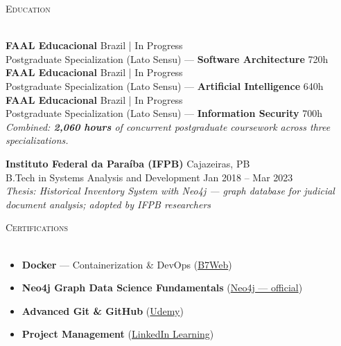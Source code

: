 \documentclass[a4paper]{article}
\newcommand{\lineunder}{
    \vspace*{-8pt} \\
    \hspace*{-18pt} \hrulefill \\
}
\newcommand{\header}[1]{
    {\hspace*{-18pt}\vspace*{6pt} \textsc{#1}}
    \vspace*{-6pt} \lineunder
}
\begin{document}
\vspace{3mm}

\header{Education}
\vspace{2mm}

\textbf{FAAL Educacional} \hfill Brazil | In Progress\\
Postgraduate Specialization (Lato Sensu) — \textbf{Software Architecture} \hfill 720h\\
\vspace{1mm}
\textbf{FAAL Educacional} \hfill Brazil | In Progress\\
Postgraduate Specialization (Lato Sensu) — \textbf{Artificial Intelligence} \hfill 640h\\
\vspace{1mm}
\textbf{FAAL Educacional} \hfill Brazil | In Progress\\
Postgraduate Specialization (Lato Sensu) — \textbf{Information Security} \hfill 700h\\
\vspace{2mm}
{\small \textit{Combined: \textbf{2,060 hours} of concurrent postgraduate coursework across three specializations.}}\\
\vspace{3mm}

\textbf{Instituto Federal da Para\'{i}ba (IFPB)} \hfill Cajazeiras, PB\\
B.Tech in Systems Analysis and Development \hfill Jan 2018 -- Mar 2023\\
{\small \textit{Thesis: Historical Inventory System with Neo4j — graph database for judicial document analysis; adopted by IFPB researchers}}\\

\vspace{3mm}

\header{Certifications}
\vspace{2mm}
\begin{itemize}[leftmargin=*, itemsep=-2pt]
    \item \textbf{Docker} — Containerization \& DevOps (\href{https://drive.google.com/drive/folders/1YKThgvnT5h1bA_Hb0uDiIf7p8Qiph-NC}{B7Web})
    \item \textbf{Neo4j Graph Data Science Fundamentals} (\href{https://graphacademy.neo4j.com/c/9d25b259-5995-4053-8475-7b2bf61f163e/}{Neo4j — official})
    \item \textbf{Advanced Git \& GitHub} (\href{https://www.udemy.com/certificate/UC-db57cce7-1471-47ff-9828-0e3a4d7da628/}{Udemy})
    \item \textbf{Project Management} (\href{https://www.linkedin.com/learning/certificates/0fc1a744c87dc72f53e8c694fd58809808a183327167377cb224c1ac43e732b6}{LinkedIn Learning})
\end{itemize}
\end{document}
